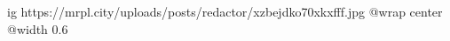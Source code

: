  
 
 
 
 

\ifcmt
  ig https://mrpl.city/uploads/posts/redactor/xzbejdko70xkxfff.jpg
  @wrap center
  @width 0.6
\fi
